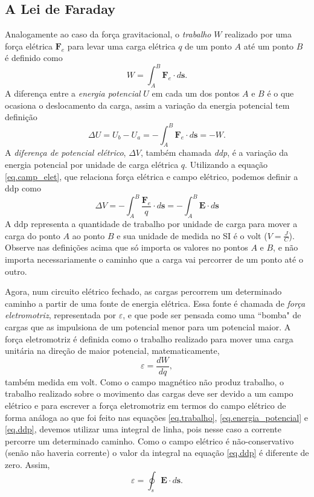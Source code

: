 \subsection{A Lei de Faraday}
Analogamente ao caso da força gravitacional, o \textit{trabalho} $W$ realizado por uma força elétrica $\textbf{F}_e$ para levar uma carga elétrica $q$ de um ponto $A$ até um ponto $B$ é definido como
\begin{equation}\label{eq.trabalho}
W=\int_{A}^{B}\textbf{F}_e\cdot d\textbf{s}.
\end{equation}
A diferença entre a \textit{energia potencial} $U$ em cada um dos pontos $A$ e $B$ é o que ocasiona o deslocamento da carga, assim a variação da energia potencial tem definição
\begin{equation}\label{eq.energia_potencial}
\Delta U=U_b-U_a=-\int_{A}^{B}\textbf{F}_e\cdot d\textbf{s}=-W.
\end{equation}
A \textit{diferença de potencial elétrico}, $\Delta V$, também chamada \textit{ddp}, é a variação da energia potencial por unidade de carga elétrica $q$. Utilizando a equação \ref{eq.camp_elet}, que relaciona força elétrica e campo elétrico, podemos definir a ddp como
\begin{equation}\label{eq.ddp}
\Delta V=-\int_{A}^{B}\frac{\textbf{F}_e}{q}\cdot d\textbf{s}=-\int_{A}^{B}\textbf{E}\cdot d\textbf{s}
\end{equation}
A ddp representa a quantidade de trabalho por unidade de carga para mover a carga do ponto $A$ ao ponto $B$ e sua unidade de medida no SI é o volt ($V=\frac{J}{C}$). Observe nas definições acima que só importa os valores no pontos $A$ e $B$, e não importa necessariamente o caminho que a carga vai percorrer de um ponto até o outro. 

Agora, num circuito elétrico fechado, as cargas percorrem um determinado caminho a partir de uma fonte de energia elétrica. Essa fonte é chamada de \textit{força eletromotriz}, representada por $\varepsilon$, e que pode ser pensada como uma ``bomba" de cargas que as impulsiona de um potencial menor para um potencial maior. A força eletromotriz é definida como o trabalho realizado para mover uma carga unitária na direção de maior potencial, matematicamente,
\begin{equation*}
\varepsilon=\frac{dW}{dq}, 
\end{equation*}
também medida em volt. Como o campo magnético não produz trabalho, o trabalho realizado sobre o movimento das cargas deve ser devido a um campo elétrico e para escrever a força eletromotriz em termos do campo elétrico de forma análoga ao que foi feito nas equações \ref{eq.trabalho}, \ref{eq.energia_potencial} e \ref{eq.ddp}, devemos utilizar uma integral de linha, pois nesse caso a corrente percorre um determinado caminho. Como o campo elétrico é não-conservativo (senão não haveria corrente) o valor da integral na equação \ref{eq.ddp} é diferente de zero. Assim,
\begin{equation}\label{eq.emf_E_nc}
\varepsilon=\oint_s\pmb{E}\cdot d\pmb{s}.
\end{equation}
 
